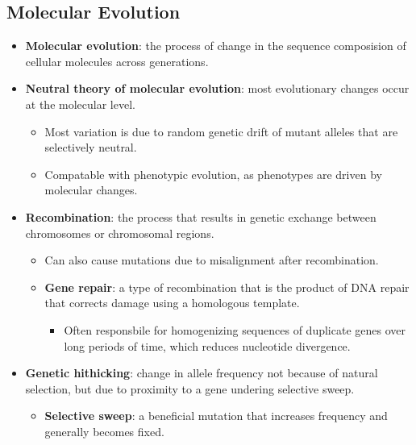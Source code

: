 \documentclass[12pt,a4paper]{article}
\begin{document}
\subsection{Molecular Evolution}
\begin{itemize}
    \item \textbf{Molecular evolution}: the process of change in the sequence composision of cellular molecules across generations.
    \item \textbf{Neutral theory of molecular evolution}: most evolutionary changes occur at the molecular level.
        \begin{itemize}
            \item Most variation is due to random genetic drift of mutant alleles that are selectively neutral.
            \item Compatable with phenotypic evolution, as phenotypes are driven by molecular changes.
        \end{itemize}
    \item \textbf{Recombination}: the process that results in genetic exchange between chromosomes or chromosomal regions.
        \begin{itemize}
            \item Can also cause mutations due to misalignment after recombination.
            \item \textbf{Gene repair}: a type of recombination that is the product of DNA repair that corrects damage using a homologous template. 
                \begin{itemize}
                    \item Often responsbile for homogenizing sequences of duplicate genes over long periods of time, which reduces nucleotide divergence.
                \end{itemize}
        \end{itemize}
    \item \textbf{Genetic hithicking}: change in allele frequency not because of natural selection, but due to proximity to a gene undering selective sweep.
        \begin{itemize}
            \item \textbf{Selective sweep}: a beneficial mutation that increases frequency and generally becomes fixed. 
        \end{itemize}
\end{itemize}
\end{document}
